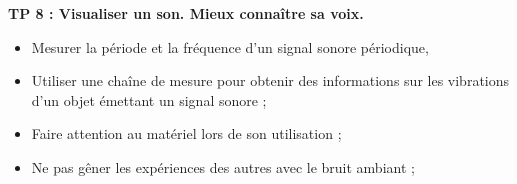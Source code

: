 \modeCorrection

\renewcommand{\thesection}{\textcolor{red}{Partie \Roman{section} -}}
\renewcommand{\thesubsection}{\textcolor{red}{\Roman{section}.\arabic{subsection}}}
\renewcommand{\thesubsubsection}{\textcolor{red}{\Roman{section}.\arabic{subsection}.\alph{subsubsection}}}

\setcounter{section}{0}
\setcounter{document}{0}
\sndEnTeteTPHuit

\begin{center}
\begin{mdframed}[style=titr, leftmargin=60pt, rightmargin=60pt, innertopmargin=7pt, innerbottommargin=7pt, innerrightmargin=8pt, innerleftmargin=8pt]

\begin{center}
\large{\textbf{TP 8 : Visualiser un son. Mieux connaître sa voix.
}}
\end{center}
\end{mdframed}
\end{center}



\begin{tcolorbox}[colback=blue!5!white,colframe=blue!75!black,title=Objectifs de la séance :]
\begin{itemize}
    \item Mesurer la période et la fréquence d'un signal sonore périodique,
    \item Utiliser une chaîne de mesure pour obtenir des informations sur les vibrations d’un objet émettant un signal sonore ;
\end{itemize}
\end{tcolorbox}

\begin{tcolorbox}[colback=red!5!white,colframe=red!75!black,title= Consignes :]
\begin{itemize}
    \item Faire attention au matériel lors de son utilisation ;
    \item Ne pas gêner les expériences des autres avec le bruit ambiant ;
\end{itemize}
\end{tcolorbox}

